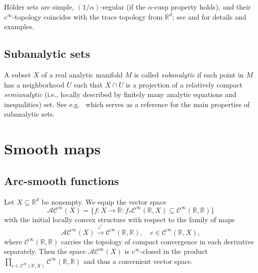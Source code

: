 \documentclass[10pt, reqno]{amsart}
\theoremstyle{plain}
\theoremstyle{definition}
\numberwithin{equation}{section}
\def\al{\alpha}
\def\R{\mathbb{R}}
\def\cC{\mathcal{C}}
\def\AS{\mathcal{AC}^\infty}
\begin{document}
H\"older sets are simple, $(1/\al)$-regular (if the $\al$-cusp property holds), and their $c^\infty$-topology 
coincides with the trace topology from $\R^d$; see \cite{Rainer18} and \cite{Rainer:2021tr} for details and examples.


\subsection{Subanalytic sets}
A subset $X$ of a real analytic manifold $M$ is called \emph{subanalytic} if each point in $M$
has a neighborhood $U$ such that $X \cap U$ is a projection of a relatively compact \emph{semianalytic} (i.e., locally described by finitely many analytic equations and 
inequalities) set. See e.g.\ \cite{BM88} which serves as a reference for the main properties of subanalytic sets.


\section{Smooth maps} \label{sec:smooth}

\subsection{Arc-smooth functions}
Let $X \subseteq \R^d$ be nonempty.
We equip the vector space 
\[
    \AS(X) = \{f : X \to \R : f_* \cC^\infty(\R,X) \subseteq \cC^\infty(\R,\R)\}
\]
with the initial locally convex structure with respect to the family of maps
\begin{equation} \label{e:str}
    \AS(X) \stackrel{c^*}{\longrightarrow} \cC^\infty(\R,\R), \quad c \in \cC^\infty(\R,X),
\end{equation}
where $\cC^\infty(\R,\R)$ carries the topology of compact convergence in each derivative separately.
Then the space $\AS(X)$ is $c^\infty$-closed in the product $\prod_{c\in \cC^\infty(\R,X)} \cC^\infty(\R,\R)$ and thus a convenient vector space.
\end{document}

